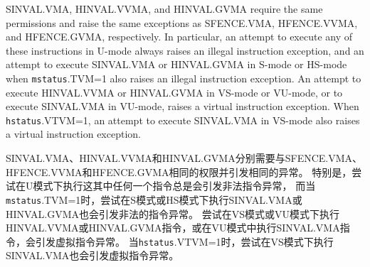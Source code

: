 SINVAL.VMA, HINVAL.VVMA, and HINVAL.GVMA require the same permissions and raise
the same exceptions as SFENCE.VMA, HFENCE.VVMA, and HFENCE.GVMA, respectively.
In particular, an attempt to execute any of these instructions in
U-mode always raises an illegal instruction exception, and an attempt
to execute SINVAL.VMA or HINVAL.GVMA in S-mode or HS-mode when
{\tt mstatus}.TVM=1 also raises an illegal instruction exception.
An attempt to execute HINVAL.VVMA or HINVAL.GVMA in VS-mode or VU-mode,
or to execute SINVAL.VMA in VU-mode, raises a virtual instruction
exception.
When {\tt hstatus}.VTVM=1, an attempt to execute SINVAL.VMA in VS-mode
also raises a virtual instruction exception.

SINVAL.VMA、HINVAL.VVMA和HINVAL.GVMA分别需要与SFENCE.VMA、
HFENCE.VVMA和HFENCE.GVMA相同的权限并引发相同的异常。
特别是，尝试在U模式下执行这其中任何一个指令总是会引发非法指令异常，
而当{\tt mstatus}.TVM=1时，尝试在S模式或HS模式下执行SINVAL.VMA或HINVAL.GVMA也会引发非法的指令异常。
尝试在VS模式或VU模式下执行HINVAL.VVMA或HINVAL.GVMA指令，或在VU模式中执行SINVAL.VMA指令，会引发虚拟指令异常。
当{\tt hstatus}.VTVM=1时，尝试在VS模式下执行SINVAL.VMA也会引发虚拟指令异常。

